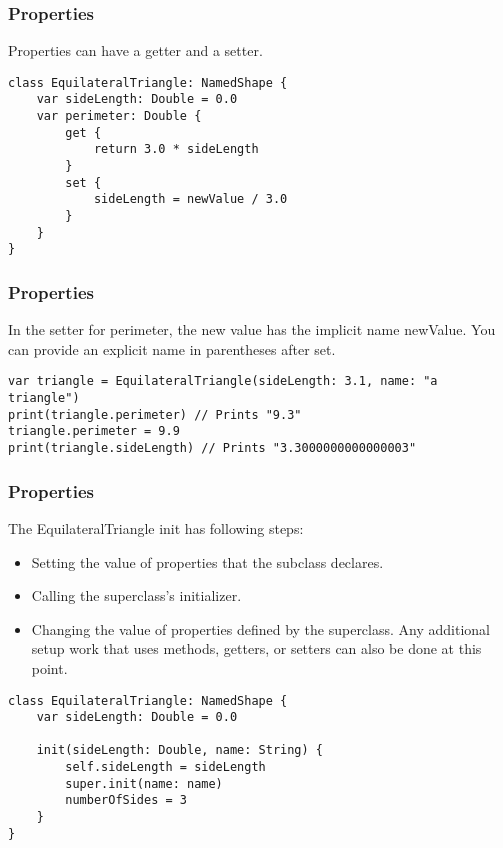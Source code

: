 \begin{frame}[fragile] \frametitle{Properties}

Properties can have a getter and a setter.

\begin{lstlisting}
class EquilateralTriangle: NamedShape {
    var sideLength: Double = 0.0
    var perimeter: Double {
        get {
            return 3.0 * sideLength
        }
        set {
            sideLength = newValue / 3.0
        }
    }
}
\end{lstlisting}


\end{frame}

\begin{frame}[fragile] \frametitle{Properties}

In the setter for perimeter, the new value has the implicit name newValue. You can provide an explicit name in parentheses after set.


\begin{lstlisting}
var triangle = EquilateralTriangle(sideLength: 3.1, name: "a triangle")
print(triangle.perimeter) // Prints "9.3"
triangle.perimeter = 9.9
print(triangle.sideLength) // Prints "3.3000000000000003"
\end{lstlisting}


\end{frame}

\begin{frame}[fragile] \frametitle{Properties}

The EquilateralTriangle init has following steps:
\begin{itemize}
\item Setting the value of properties that the subclass declares.
\item Calling the superclass’s initializer.
\item Changing the value of properties defined by the superclass. Any additional setup work that uses methods, getters, or setters can also be done at this point.
\end{itemize}

\begin{lstlisting}
class EquilateralTriangle: NamedShape {
    var sideLength: Double = 0.0

    init(sideLength: Double, name: String) {
        self.sideLength = sideLength
        super.init(name: name)
        numberOfSides = 3
    }
}
\end{lstlisting}

\end{frame}

